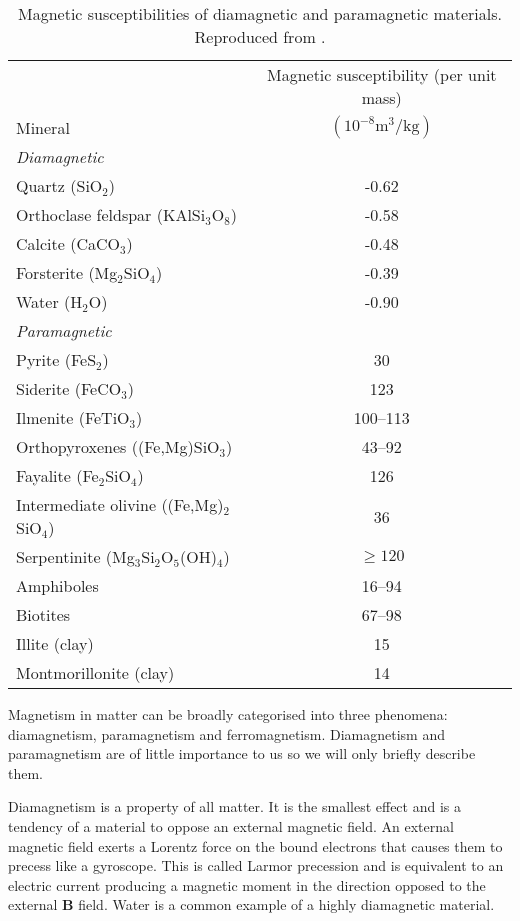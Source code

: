 \begin{table}\label{Susc}
\begin{tabular}{l c}
\hline
\hline
  & Magnetic susceptibility (per unit mass) \\ \cline{2-2}
Mineral & $(10^{-8} \mathrm{m}^{3}/\mathrm{kg})$ \\ \hline
\textit{Diamagnetic} & \\
Quartz (SiO$_2$) & -0.62 \\
Orthoclase feldspar (KAlSi$_3$O$_8$) & -0.58 \\
Calcite (CaCO$_3$) & -0.48 \\
Forsterite (Mg$_2$SiO$_4$) & -0.39 \\
Water (H$_2$O) & -0.90 \\
\textit{Paramagnetic} & \\
Pyrite (FeS$_2$) & 30 \\
Siderite (FeCO$_3$) & 123 \\
Ilmenite (FeTiO$_3$) & 100--113 \\
Orthopyroxenes ((Fe,Mg)SiO$_3$) & 43--92 \\
Fayalite (Fe$_2$SiO$_4$) & 126 \\
Intermediate olivine ((Fe,Mg)$_2$SiO$_4$) & 36 \\
Serpentinite (Mg$_3$Si$_2$O$_5$(OH)$_4$) & $\geq 120$ \\
Amphiboles & 16--94 \\
Biotites & 67--98 \\
Illite (clay) & 15 \\
Montmorillonite (clay) & 14 \\
\hline
\hline
\end{tabular}
\caption{Magnetic susceptibilities of diamagnetic and paramagnetic materials. Reproduced from \citet{DuOzRM}.}
\end{table}

Magnetism in matter can be broadly categorised into three phenomena: diamagnetism, paramagnetism and ferromagnetism. Diamagnetism and paramagnetism are of little importance to us so we will only briefly describe them.\par

Diamagnetism is a property of all matter. It is the smallest effect and is a tendency of a material to oppose an external magnetic field. An external magnetic field exerts a Lorentz force on the bound electrons that causes them to precess like a gyroscope. This is called Larmor precession and is equivalent to an electric current producing a magnetic moment in the direction opposed to the external $\mathbf{B}$ field. Water is a common example of a highly diamagnetic material.\par

